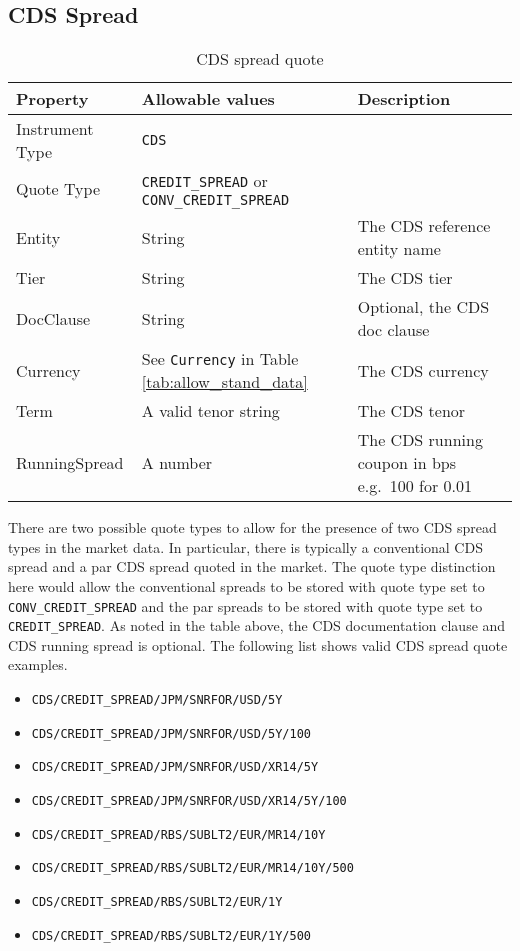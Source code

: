 \subsection{CDS Spread}
\label{md:cds_spread_quote}

\begin{table}[H]
\centering
  \begin{tabular}{|p{3cm}|p{3.5cm}|p{7cm}|}
    \hline
    {\bf Property} & {\bf Allowable values} & {\bf Description} \\ \hline
    Instrument Type & \lstinline!CDS! & \\ \hline
    Quote Type & \lstinline!CREDIT_SPREAD! or \lstinline!CONV_CREDIT_SPREAD! & \\ \hline
    Entity & String & The CDS reference entity name \\ \hline
    Tier & String & The CDS tier \\ \hline
    DocClause & String & Optional, the CDS doc clause \\ \hline
    Currency & See \lstinline!Currency! in Table \ref{tab:allow_stand_data} & The CDS currency\\ \hline
    Term & A valid tenor string & The CDS tenor\\ \hline
    RunningSpread & A number & The CDS running coupon in bps e.g.\ 100 for 0.01\\ \hline
  \end{tabular}
  \caption{CDS spread quote}
  \label{tab:cdsspread_quote}
\end{table}

There are two possible quote types to allow for the presence of two CDS spread types in the market data. In particular, there is typically a conventional CDS spread and a par CDS spread quoted in the market. The quote type distinction here would allow the conventional spreads to be stored with quote type set to \lstinline!CONV_CREDIT_SPREAD! and the par spreads to be stored with quote type set to \lstinline!CREDIT_SPREAD!. As noted in the table above, the CDS documentation clause and CDS running spread is optional. The following list shows valid CDS spread quote examples.
\begin{itemize}
\item \lstinline!CDS/CREDIT_SPREAD/JPM/SNRFOR/USD/5Y!
\item \lstinline!CDS/CREDIT_SPREAD/JPM/SNRFOR/USD/5Y/100!
\item \lstinline!CDS/CREDIT_SPREAD/JPM/SNRFOR/USD/XR14/5Y!
\item \lstinline!CDS/CREDIT_SPREAD/JPM/SNRFOR/USD/XR14/5Y/100!
\item \lstinline!CDS/CREDIT_SPREAD/RBS/SUBLT2/EUR/MR14/10Y!
\item \lstinline!CDS/CREDIT_SPREAD/RBS/SUBLT2/EUR/MR14/10Y/500!
\item \lstinline!CDS/CREDIT_SPREAD/RBS/SUBLT2/EUR/1Y!
\item \lstinline!CDS/CREDIT_SPREAD/RBS/SUBLT2/EUR/1Y/500!
\end{itemize}

